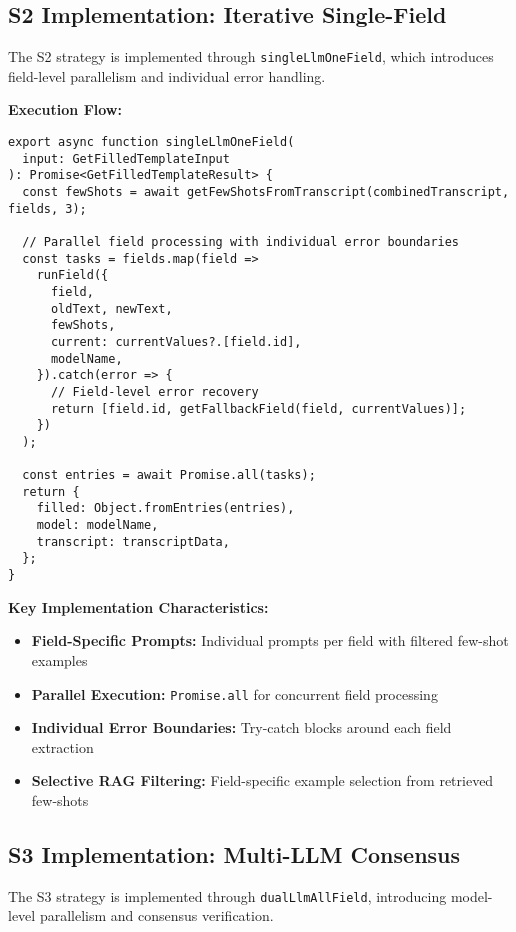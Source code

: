 \subsection{S2 Implementation: Iterative Single-Field}
\label{subsec:impl-s2}

The S2 strategy is implemented through \texttt{singleLlmOneField}, which introduces field-level parallelism and individual error handling.

\textbf{Execution Flow:}
\begin{verbatim}
export async function singleLlmOneField(
  input: GetFilledTemplateInput
): Promise<GetFilledTemplateResult> {
  const fewShots = await getFewShotsFromTranscript(combinedTranscript, fields, 3);
  
  // Parallel field processing with individual error boundaries
  const tasks = fields.map(field => 
    runField({
      field,
      oldText, newText,
      fewShots,
      current: currentValues?.[field.id],
      modelName,
    }).catch(error => {
      // Field-level error recovery
      return [field.id, getFallbackField(field, currentValues)];
    })
  );
  
  const entries = await Promise.all(tasks);
  return {
    filled: Object.fromEntries(entries),
    model: modelName,
    transcript: transcriptData,
  };
}
\end{verbatim}

\textbf{Key Implementation Characteristics:}
\begin{itemize}
    \item \textbf{Field-Specific Prompts:} Individual prompts per field with filtered few-shot examples
    \item \textbf{Parallel Execution:} \texttt{Promise.all} for concurrent field processing
    \item \textbf{Individual Error Boundaries:} Try-catch blocks around each field extraction
    \item \textbf{Selective RAG Filtering:} Field-specific example selection from retrieved few-shots
\end{itemize}

\subsection{S3 Implementation: Multi-LLM Consensus}
\label{subsec:impl-s3}

The S3 strategy is implemented through \texttt{dualLlmAllField}, introducing model-level parallelism and consensus verification.

